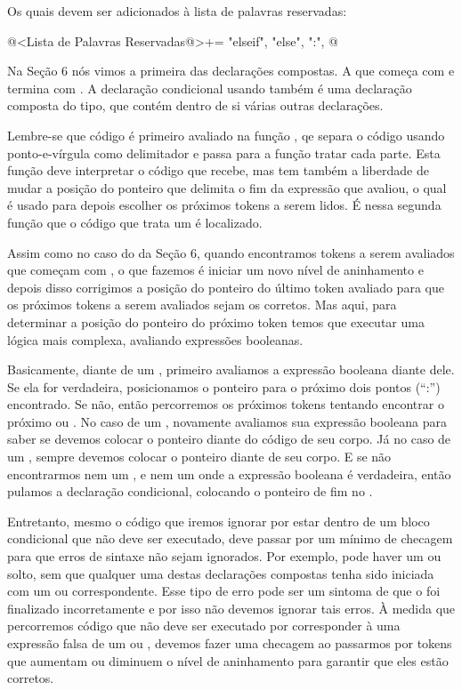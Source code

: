 {Os quais devem ser adicionados à lista de palavras reservadas:

\iniciocodigo
@<Lista de Palavras Reservadas@>+=
"elseif", "else", ":",
@
\fimcodigo

Na Seção 6 nós vimos a primeira das declarações compostas. A que
começa com  e termina
com . A declaração condicional
usando  também é uma declaração composta do tipo, que
contém dentro de si várias outras declarações.

Lembre-se que código é primeiro avaliado na
função , qe separa o código
usando ponto-e-vírgula como delimitador e passa para a
função  tratar cada parte. Esta função
deve interpretar o código que recebe, mas tem também a liberdade de
mudar a posição do ponteiro que delimita o fim da expressão que
avaliou, o qual é usado para depois escolher os próximos tokens a
serem lidos. É nessa segunda função que o código que trata
um  é localizado.

Assim como no caso do  da Seção 6,
quando encontramos tokens a serem avaliados que começam
com , o que fazemos é iniciar um novo nível de
aninhamento e depois disso corrigimos a posição do ponteiro do último
token avaliado para que os próximos tokens a serem avaliados sejam os
corretos. Mas aqui, para determinar a posição do ponteiro do próximo
token temos que executar uma lógica mais complexa, avaliando
expressões booleanas.

Basicamente, diante de um , primeiro avaliamos a
expressão booleana diante dele. Se ela for verdadeira, posicionamos o
ponteiro para o próximo dois pontos (``:'') encontrado. Se não, então
percorremos os próximos tokens tentando encontrar o
próximo  ou . No caso de
um , novamente avaliamos sua expressão booleana
para saber se devemos colocar o ponteiro diante do código de seu
corpo. Já no caso de um , sempre devemos colocar o
ponteiro diante de seu corpo. E se não encontrarmos nem
um , e nem um  onde a expressão
booleana é verdadeira, então pulamos a declaração condicional,
colocando o ponteiro de fim no .

Entretanto, mesmo o código que iremos ignorar por estar dentro de um
bloco condicional que não deve ser executado, deve passar por um
mínimo de checagem para que erros de sintaxe não sejam ignorados. Por
exemplo, pode haver um  ou 
solto, sem que qualquer uma destas declarações compostas tenha sido
iniciada com um  ou 
correspondente. Esse tipo de erro pode ser um sintoma de que
o  foi finalizado incorretamente e por isso não devemos
ignorar tais erros. À medida que percorremos código que não deve ser
executado por corresponder à uma expressão falsa de um 
ou , devemos fazer uma checagem ao passarmos por
tokens que aumentam ou diminuem o nível de aninhamento para garantir
que eles estão corretos.

}

